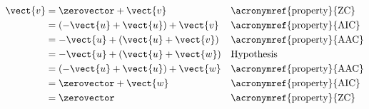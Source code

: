\begin{align*}
\vect{v}
&= \zerovector + \vect{v}&&\text{\acronymref{property}{ZC}}\\
&= (-\vect{u} + \vect{u}) + \vect{v}&&\text{\acronymref{property}{AIC}}\\
&= -\vect{u} + (\vect{u} + \vect{v})&&\text{\acronymref{property}{AAC}}\\
&= -\vect{u} + (\vect{u} + \vect{w})&&\text{Hypothesis}\\
&= (-\vect{u} + \vect{u}) + \vect{w}&&\text{\acronymref{property}{AAC}}\\
&= \zerovector + \vect{w}&&\text{\acronymref{property}{AIC}}\\
&= \zerovector&&\text{\acronymref{property}{ZC}}\\
\end{align*}
